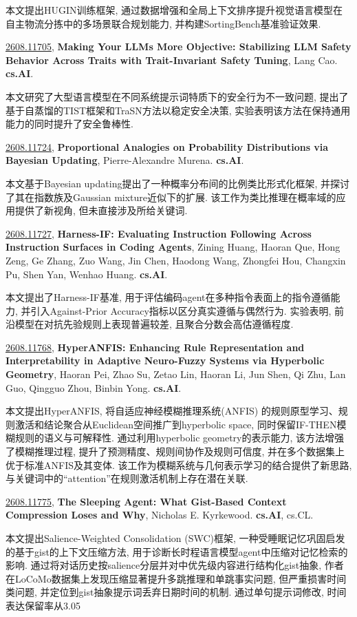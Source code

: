 \documentclass[9pt, a4paper]{article}
\theoremstyle{plain}
\theoremstyle{definition}
\theoremstyle{remark}
\newcommand{\arxivwithtarget}[3]{\hypertarget{#1}{}\href{https://arxiv.org/abs/#1}{#1}, \textbf{\textcolor{arxivblue}{#2}}, #3. }
\begin{document}
本文提出HUGIN训练框架, 通过数据增强和全局上下文排序提升视觉语言模型在自主物流分拣中的多场景联合规划能力, 并构建SortingBench基准验证效果.


\arxivwithtarget{2608.11705}{Making Your LLMs More Objective: Stabilizing LLM Safety Behavior Across Traits with Trait-Invariant Safety Tuning}{Lang Cao}\textbf{cs.AI}.

本文研究了大型语言模型在不同系统提示词特质下的安全行为不一致问题, 提出了基于自蒸馏的TIST框架和TraSN方法以稳定安全决策, 实验表明该方法在保持通用能力的同时提升了安全鲁棒性.


\arxivwithtarget{2608.11724}{Proportional Analogies on Probability Distributions via Bayesian Updating}{Pierre-Alexandre Murena}\textbf{cs.AI}.

本文基于Bayesian updating提出了一种概率分布间的比例类比形式化框架, 并探讨了其在指数族及Gaussian mixture近似下的扩展. 该工作为类比推理在概率域的应用提供了新视角, 但未直接涉及所给关键词.


\arxivwithtarget{2608.11727}{Harness-IF: Evaluating Instruction Following Across Instruction Surfaces in Coding Agents}{Zining Huang, Haoran Que, Hong Zeng, Ge Zhang, Zuo Wang, Jin Chen, Haodong Wang, Zhongfei Hou, Changxin Pu, Shen Yan, Wenhao Huang}\textbf{cs.AI}.

本文提出了Harness-IF基准, 用于评估编码agent在多种指令表面上的指令遵循能力, 并引入Against-Prior Accuracy指标以区分真实遵循与偶然行为. 实验表明, 前沿模型在对抗先验规则上表现普遍较差, 且聚合分数会高估遵循程度.


\arxivwithtarget{2608.11768}{HyperANFIS: Enhancing Rule Representation and Interpretability in Adaptive Neuro-Fuzzy Systems via Hyperbolic Geometry}{Haoran Pei, Zhao Su, Zetao Lin, Haoran Li, Jun Shen, Qi Zhu, Lan Guo, Qingguo Zhou, Binbin Yong}\textbf{cs.AI}.

本文提出HyperANFIS, 将自适应神经模糊推理系统(ANFIS) 的规则原型学习、规则激活和结论聚合从Euclidean空间推广到hyperbolic space, 同时保留IF-THEN模糊规则的语义与可解释性. 通过利用hyperbolic geometry的表示能力, 该方法增强了模糊推理过程, 提升了预测精度、规则间协作及规则可信度, 并在多个数据集上优于标准ANFIS及其变体. 该工作为模糊系统与几何表示学习的结合提供了新思路, 与关键词中的“attention”在规则激活机制上存在潜在关联.


\arxivwithtarget{2608.11775}{The Sleeping Agent: What Gist-Based Context Compression Loses and Why}{Nicholas E. Kyrkewood}\textbf{cs.AI}, cs.CL.

本文提出Salience-Weighted Consolidation (SWC)框架, 一种受睡眠记忆巩固启发的基于gist的上下文压缩方法, 用于诊断长时程语言模型agent中压缩对记忆检索的影响. 通过将对话历史按salience分层并对中优先级内容进行结构化gist抽象, 作者在LoCoMo数据集上发现压缩显著提升多跳推理和单跳事实问题, 但严重损害时间类问题, 并定位到gist抽象提示词丢弃日期时间的机制. 通过单句提示词修改, 时间表达保留率从3.05%
\end{document}

